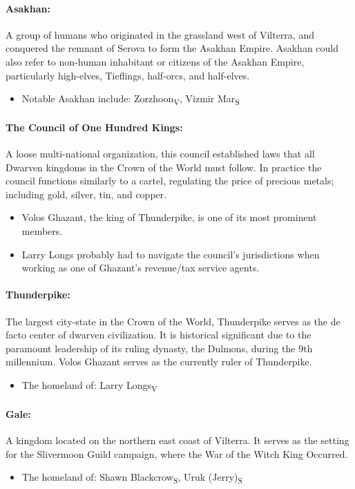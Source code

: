 \documentclass[../main.tex]{subfiles}
\begin{document}
\paragraph{Asakhan:}
A group of humans who originated in the grassland west of Vilterra, and conquered the remnant of Serova to form the Asakhan Empire. Asakhan could also refer to non-human inhabitant or citizens of the Asakhan Empire, particularly high-elves, Tieflings, half-orcs, and half-elves.
\begin{itemize}
    \item Notable Asakhan include: Zorzhoon\textsubscript{V}, Vizmir Mar\textsubscript{S}
\end{itemize}
\paragraph{The Council of One Hundred Kings:}
A loose multi-national organization, this council established laws that all Dwarven kingdoms in the Crown of the World must follow. In practice the council functions similarly to a cartel, regulating the price of precious metals; including gold, silver, tin, and copper.
\begin{itemize}
    \item Volos Ghazant, the king of Thunderpike, is one of its most prominent members.
    \item Larry Longs probably had to navigate the council’s jurisdictions when working as one of Ghazant’s revenue/tax service agents.
\end{itemize}
\paragraph{Thunderpike:}
The largest city-state in the Crown of the World, Thunderpike serves as the de facto center of dwarven civilization. It is historical significant due to the paramount leadership of its ruling dynasty, the Dulmons, during the 9th millennium. Volos Ghazant serves as the currently ruler of Thunderpike.
\begin{itemize}
    \item The homeland of: Larry Longs\textsubscript{V}
\end{itemize}
\paragraph{Gale:}
A kingdom located on the northern east coast of Vilterra. It serves as the setting for the Slivermoon Guild campaign, where the War of the Witch King Occurred.
\begin{itemize}
    \item The homeland of: Shawn Blackcrow\textsubscript{S}, Uruk (Jerry)\textsubscript{S}
\end{itemize}
\end{document}
